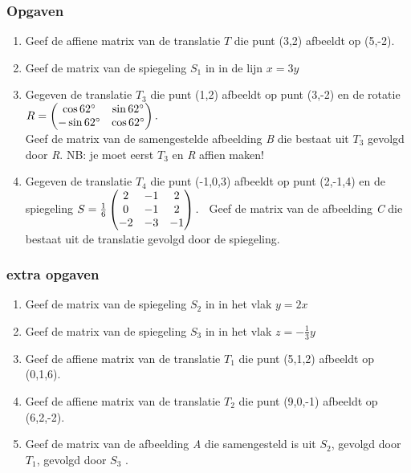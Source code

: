\subsubsection{Opgaven}
\begin{enumerate}
	\item Geef de affiene matrix van de translatie \textit{$ T $}  die punt (3,2) afbeeldt op (5,-2).	   
	
	\item Geef de matrix van de spiegeling  \textit{$ S_1 $} in \RD in de lijn $ x = 3 y $
	
	\item Gegeven de translatie \textit{$ T_{3} $}  die punt (1,2) afbeeldt op punt (3,-2) en de rotatie \\
	$ R  =  \begin{pmatrix}   \cos 62\degree & \sin 62\degree \\  -\sin 62\degree & \cos 62\degree \end{pmatrix}.  $ \ \\
	Geef de matrix van de samengestelde afbeelding \textit{B } die bestaat uit \textit{$ T_{3} $}  gevolgd door \textit{R}. NB: je moet eerst \textit{$ T_{3} $} en \textit{R} affien maken!
	
	\item Gegeven de translatie \textit{$ T_{4} $}  die punt (-1,0,3) afbeeldt op punt (2,-1,4) en de spiegeling 
	$ S = \frac{1}{6} 
	\begin{pmatrix}  2& -1 &  2 \\  0& -1 & 2 \\  -2 & -3 & -1 \end{pmatrix}. $  \ 
	Geef de matrix van de afbeelding \textit{C} die bestaat uit de translatie gevolgd door de spiegeling.
\end{enumerate}

\subsubsection{extra opgaven}
\begin{enumerate}
	\item Geef de matrix van de spiegeling \textit{$ S_2 $}  in \RD in het vlak $ y= 2x $
	
	\item Geef de matrix van de spiegeling \textit{$ S_3 $}  in \RD in het vlak $ z= -\frac{1}{3}y $
	
	\item Geef de affiene matrix van de translatie \textit{$ T_{1} $}  die punt (5,1,2) afbeeldt op (0,1,6).
	
	\item Geef de affiene matrix van de translatie \textit{$ T_{2} $}  die punt (9,0,-1) afbeeldt op (6,2,-2).	    
	
	\item Geef de matrix van de afbeelding \textit{A } die samengesteld is uit \textit{$ S_2 $}, gevolgd door \textit{$ T_1 $}, gevolgd door \textit{$ S_3 $} .  
\end{enumerate}

